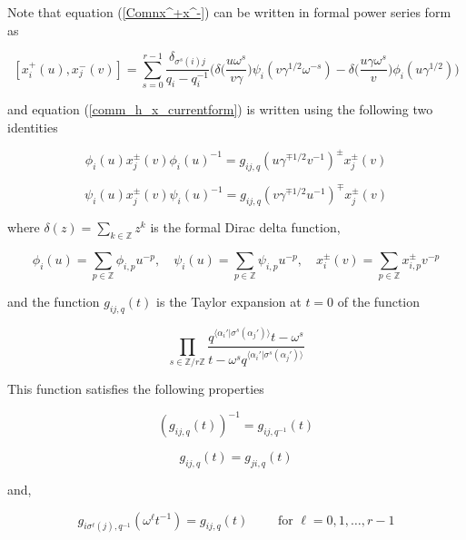 \documentclass[12pt]{amsart}
\numberwithin{equation}{section}
\newcommand{\Z}{\ensuremath{\mathbb{Z}}}
\begin{document}
Note that equation (\ref{Comnx^+x^-}) can be written in formal power series form as

\begin{equation}\label{gencommx^+x^-}
    [x_i^+(u), x_j^{-}(v)] = \sum_{s=0}^{r-1} \frac{\delta_{\sigma^s(i)j}}{q_i-q_i^{-1}}\Big(\delta\Big(\frac{u\omega^s}{v\gamma }\Big)\psi_i(v\gamma^{1/2}\omega^{-s}) - \delta\Big(\frac{u\gamma \omega^s}{v }\Big)\phi_i(u\gamma^{1/2})\Big)
\end{equation}


and equation (\ref{comm_h_x_currentform}) is written using the following two identities 

\begin{equation}\label{conm-PhiX_gen}
    \phi_i(u)x_j^{\pm}(v)\phi_i(u)^{-1} = g_{ij,q}(u\gamma^{\mp 1/2}v^{-1})^{\pm}x_j^{\pm}(v)
\end{equation}

\begin{equation}\label{conm-PsiX_gen}
    \psi_i(u)x_j^{\pm}(v)\psi_i(u)^{-1} = g_{ij,q}(v\gamma^{\mp 1/2}u^{-1})^{\mp}x_j^{\pm}(v)
\end{equation}

where $\delta(z) = \sum_{k\in \Z}z^k$ is the formal Dirac delta function, 

$$ \phi_i(u) = \sum_{p\in \Z} \phi_{i,p} u^{-p}, \quad \psi_i(u) = \sum_{p\in \Z} \psi_{i,p} u^{-p}, \quad x_i^{\pm }(v) = \sum_{p\in \Z} x^{\pm}_{i,p} v^{-p} $$

and the function $g_{ij,q}(t)$ is the Taylor expansion at $t=0$ of the function 

$$ \prod_{s\in \Z/r\Z} \frac{ q^{\langle \alpha_i' | \sigma^s(\alpha_j') \rangle}t-\omega^s}{ t - \omega^sq^{\langle \alpha_i' | \sigma^s(\alpha_j') \rangle}}$$

This function satisfies the following properties

\begin{equation}\label{0sym}
    (g_{ij,q}(t))^{-1} = g_{ij,q^{-1}}(t)
\end{equation}

\begin{equation}\label{1sym}
    g_{ij,q}(t) = g_{ji,q}(t)
\end{equation}

and,

\begin{equation}\label{2sym}
    g_{i\sigma^{\ell}(j),q^{-1}}(\omega^{\ell}t^{-1})=g_{ij,q}(t) \quad \quad \text{ for } \ell=0,1,\ldots, r-1 
\end{equation}
\end{document}
